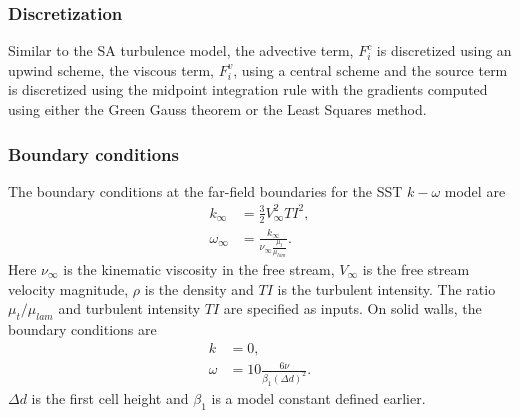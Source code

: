 \subsubsection{Discretization}
Similar to the SA turbulence model, the advective term, $F^c_i$ is discretized using an upwind scheme, the viscous term, $F^v_i$, using a central scheme and the source term is discretized using the midpoint integration rule with the gradients computed using either the Green Gauss theorem or the Least Squares method. 

\subsubsection{Boundary conditions}
The boundary conditions at the far-field boundaries for the SST $k-\omega$ model are
\begin{align}
k_{\infty}  &= \frac{3}{2} V_{\infty}^2 TI^{2},\nonumber\\
\omega_{\infty} &= \frac{k_{\infty}}{\nu_{\infty}\frac{\mu_t}{\mu_{lam}}}.
\end{align}
Here $\nu_{\infty}$ is the kinematic viscosity in the free stream, $V_{\infty}$ is the free stream velocity magnitude, $\rho$ is the density and $TI$ is the turbulent intensity. The ratio $\mu_t/\mu_{lam}$ and turbulent intensity $TI$ are specified as inputs. 
On solid walls, the boundary conditions are 
\begin{align}
k &= 0, \nonumber \\
\omega &= 10 \frac{6 \nu}{\beta_1(\Delta d)^2}.
\end{align}
$\Delta d$ is the first cell height and $\beta_1$ is a model constant defined earlier.







